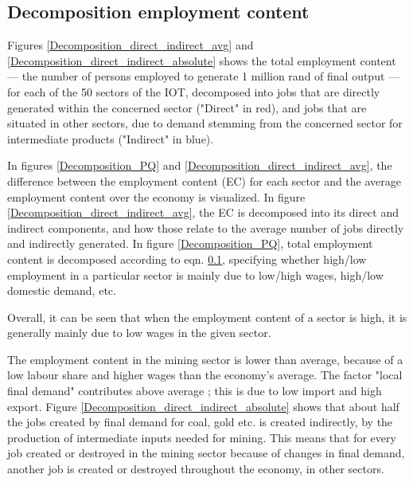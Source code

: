 \documentclass[12pt,english]{article}
\begin{document}

\subsection{Decomposition employment content}
Figures \ref{Decomposition_direct_indirect_avg} and \ref{Decomposition_direct_indirect_absolute} shows the total employment content --- the number of persons employed to generate 1 million rand of final output --- for each of the 50 sectors of the IOT, decomposed into jobs that are directly generated within the concerned sector ("Direct" in red), and jobs that are situated in other sectors, due to demand stemming from the concerned sector for intermediate products ("Indirect" in blue).

In figures \ref{Decomposition_PQ} and \ref{Decomposition_direct_indirect_avg}, the difference between the employment content (EC) for each sector and the average employment content over the economy is visualized. In figure \ref{Decomposition_direct_indirect_avg},  the EC is decomposed into its direct and indirect components, and how those relate to the average number of jobs directly and indirectly generated. In figure \ref{Decomposition_PQ}, total employment content is decomposed according to eqn. \ref{}, specifying whether high/low employment in a particular sector is mainly due to low/high wages, high/low domestic demand, etc.

Overall, it can be seen that when the employment content of a sector is high, it is generally mainly due to low wages in the given sector. 

The employment content in the mining sector is lower than average, because of a low labour share and higher wages than the economy's average. The factor "local final demand" contributes above average ; this is due to low import and high export. Figure \ref{Decomposition_direct_indirect_absolute} shows that about half the jobs created by final demand for coal, gold etc. is created indirectly, by the production of intermediate inputs needed for mining. This means that for every job created or destroyed in the mining sector because of changes in final demand, another job is created or destroyed throughout the economy, in other sectors.
\end{document}
